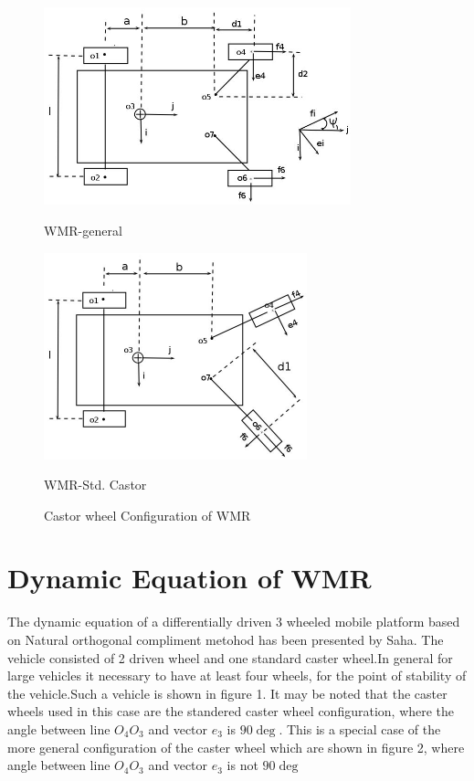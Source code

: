 \begin{figure}
	\begin{minipage}[t]{0.5\textwidth}
	\centering
		\includegraphics[width=3.5in]{Chapter4/fig/fig2.jpg} 
		\caption{WMR-general}\label{fig:gen}
	\end{minipage}
	\hfill
	\begin{minipage}[t]{0.5\textwidth}
	\centering
		\includegraphics[width=3in]{Chapter4/fig/fig1.jpg} 
		\caption{WMR-Std. Castor}\label{fig:std}
	\end{minipage}
\caption{Castor wheel Configuration of WMR}
\end{figure}


\section{Dynamic Equation of WMR}
The dynamic equation of a differentially driven 3 wheeled mobile platform based on Natural orthogonal compliment metohod has been presented by Saha\cite{saha1991dynamics}. The vehicle consisted of 2 driven wheel and one standard caster wheel.In general for large vehicles it necessary to have at least four wheels, for the point of stability of the vehicle.Such a vehicle is shown in figure 1. It may be noted that the caster wheels used in this case are the standered caster wheel configuration, where the angle between line $O_4O_3$ and vector $e_3$ is  $90\deg$. This is a special case of the more general configuration of the caster wheel which are shown in figure 2, where angle between line $O_4O_3$ and vector $e_3$ is not $90\deg$

